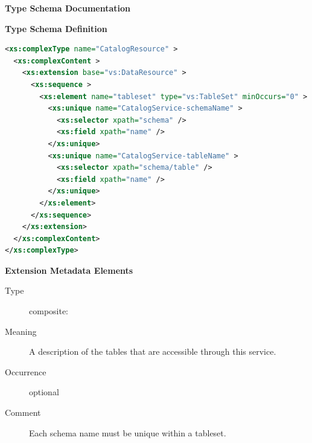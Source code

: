 \documentclass[11pt,a4paper]{ivoa}
\begin{document}
\begin{generated}
\begingroup
        \renewcommand*\descriptionlabel[1]{%
        \hbox to 5.5em{\emph{#1}\hfil}}\vspace{2ex}\noindent\textbf{ Type Schema Documentation}



\vspace{1ex}\noindent\textbf{ Type Schema Definition}

\begin{lstlisting}[language=XML,basicstyle=\footnotesize]
<xs:complexType name="CatalogResource" >
  <xs:complexContent >
    <xs:extension base="vs:DataResource" >
      <xs:sequence >
        <xs:element name="tableset" type="vs:TableSet" minOccurs="0" >
          <xs:unique name="CatalogService-schemaName" >
            <xs:selector xpath="schema" />
            <xs:field xpath="name" />
          </xs:unique>
          <xs:unique name="CatalogService-tableName" >
            <xs:selector xpath="schema/table" />
            <xs:field xpath="name" />
          </xs:unique>
        </xs:element>
      </xs:sequence>
    </xs:extension>
  </xs:complexContent>
</xs:complexType>
\end{lstlisting}

\vspace{0.5ex}\noindent\textbf{ Extension Metadata Elements}

\begingroup\small\begin{bigdescription}\item[Element \xmlel{tableset}]
\begin{description}
\item[Type] composite: 
\item[Meaning] A description of the tables that are accessible
                       through this service.
\item[Occurrence] optional
\item[Comment] Each schema name must be unique within a tableset.

\end{description}


\end{bigdescription}\endgroup

\endgroup
\end{generated}
\end{document}
